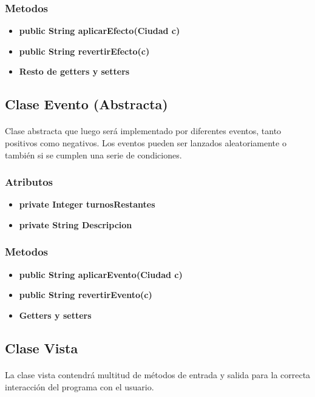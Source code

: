 \documentclass[12pt,a4paper]{article}
\begin{document}
        \subsubsection{Metodos}
        \begin{itemize}
            \item \textbf{public String aplicarEfecto(Ciudad c)}
            \item \textbf{public String revertirEfecto(c)}
            \item \textbf{Resto de getters y setters} 
        \end{itemize}
    \subsection{Clase Evento (Abstracta)}
    \paragraph{}
    Clase abstracta que luego será implementado por diferentes eventos, tanto positivos como negativos. Los eventos pueden ser lanzados
    aleatoriamente o también si se cumplen una serie de condiciones.
        \subsubsection{Atributos}
        \begin{itemize}
            \item \textbf{private Integer turnosRestantes}
            \item \textbf{private String Descripcion}
        \end{itemize}
        \subsubsection{Metodos}
        \begin{itemize}
            \item \textbf{public String aplicarEvento(Ciudad c)}
            \item \textbf{public String revertirEvento(c)}
            \item \textbf{Getters y setters}
        \end{itemize}
        \subsection{Clase Vista}
        \paragraph{}
        La clase vista contendrá multitud de métodos de entrada y salida para la correcta interacción del programa con el usuario.
\end{document}
